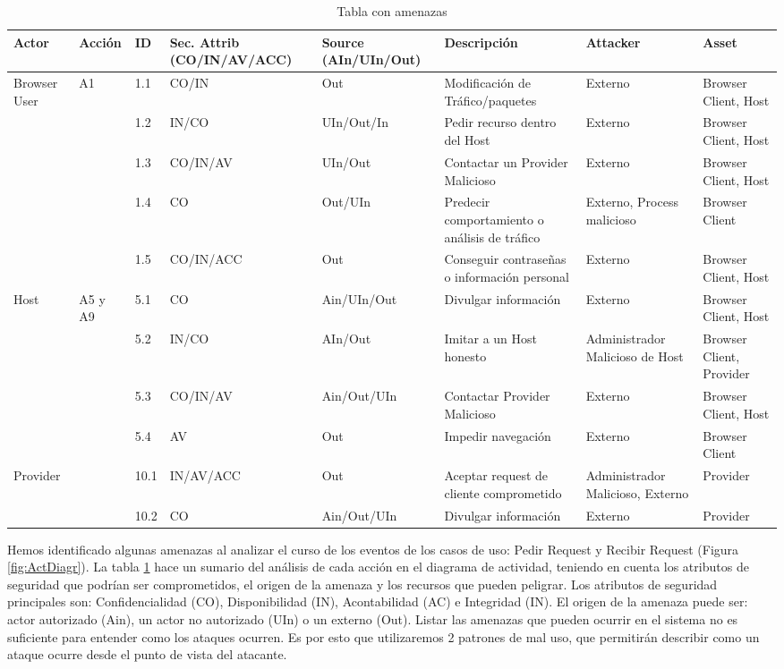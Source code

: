 \begin{landscape}%
\begin{table}[ht]
\caption{Tabla con amenazas}
\centering
\begin{tabular}{ |m{3.5em}|m{2.5em}|m{1.5em}|m{6em}|m{6em}|m{10em}|m{6em}|m{7em}|} 
\hline
Actor & Acción & ID & Sec. Attrib (CO/IN/AV/ACC) & Source (AIn/UIn/Out) & Descripción & Attacker & Asset\\
\hline
\multirow{5}{1em}{Browser User} & \multirow{5}{1em}{A1} & 1.1 & CO/IN & Out & Modificación de Tráfico/paquetes & Externo & Browser Client, Host\\ 
& & 1.2 & IN/CO & UIn/Out/In & Pedir recurso dentro del Host & Externo & Browser Client, Host\\
& & 1.3 & CO/IN/AV & UIn/Out & Contactar un Provider Malicioso & Externo & Browser Client, Host\\
& & 1.4 & CO & Out/UIn & Predecir comportamiento o análisis de tráfico & Externo, Process malicioso & Browser Client\\
& & 1.5 & CO/IN/ACC & Out & Conseguir contraseñas o información personal & Externo & Browser Client, Host\\
\hline
\multirow{4}{1em}{Host} & \multirow{5}{1em}{A5 y A9} & 5.1 & CO & Ain/UIn/Out & Divulgar información & Externo & Browser Client, Host\\ 
& & 5.2 & IN/CO & AIn/Out & Imitar a un Host honesto & Administrador Malicioso de Host & Browser Client, Provider\\
& & 5.3 & CO/IN/AV & Ain/Out/UIn & Contactar Provider Malicioso & Externo & Browser Client, Host\\
& & 5.4 & AV & Out & Impedir navegación & Externo & Browser Client\\
\hline
\multirow{2}{1em}{Provider} & \multirow{5}{1em}{A10} & 10.1 & IN/AV/ACC & Out & Aceptar request de cliente comprometido & Administrador Malicioso, Externo & Provider\\ 
& & 10.2 & CO & Ain/Out/UIn & Divulgar información & Externo & Provider\\

\hline
\end{tabular}
\label{tab:threats}
\end{table}
\end{landscape}

Hemos identificado algunas amenazas al analizar el curso de los eventos de los casos de uso: Pedir Request y Recibir Request (Figura \ref{fig:ActDiagr}). La tabla \ref{tab:threats} hace un sumario del análisis de cada acción en el diagrama de actividad, teniendo en cuenta los atributos de seguridad que podrían ser comprometidos, el origen de la amenaza y los recursos que pueden peligrar. Los atributos de seguridad principales son: Confidencialidad (CO), Disponibilidad (IN), Acontabilidad (AC) e Integridad (IN). El origen de la amenaza puede ser: actor autorizado (Ain), un actor no autorizado (UIn) o un externo (Out).
Listar las amenazas que pueden ocurrir en el sistema no es suficiente para entender como los ataques ocurren. Es por esto que utilizaremos 2 patrones de mal uso, que permitirán describir como un ataque ocurre desde el punto de vista del atacante.

